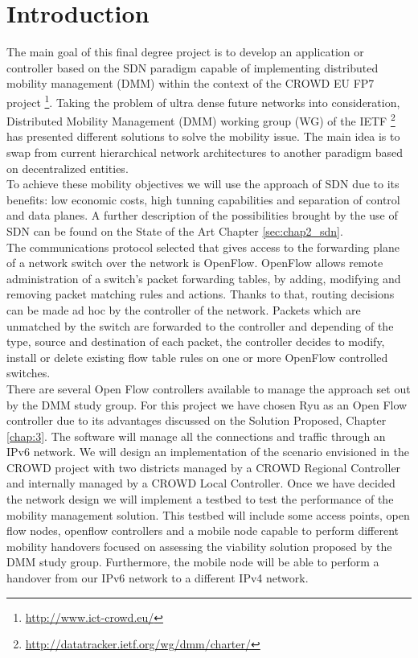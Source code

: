 \chapter{Introduction}\label{chap:1}
The main goal of this final degree project is to develop an application or controller based on the SDN \cite{sdn_wiki} paradigm capable of implementing distributed mobility management (DMM) \cite{ddm_standars_landscape} within the context of the CROWD EU FP7 project \footnote{\url{http://www.ict-crowd.eu/}}. Taking the problem of ultra dense future networks into consideration, Distributed Mobility Management (DMM) working group (WG) of the IETF \footnote{\url{http://datatracker.ietf.org/wg/dmm/charter/}} has presented different solutions to solve the mobility issue. The main idea is to swap from current hierarchical network architectures to another paradigm based on decentralized entities.\\

To achieve these mobility objectives we will use the approach of SDN due to its benefits: low economic costs, high tunning capabilities and separation of control and data planes. A further description of the possibilities brought by the use of SDN can be found on the State of the Art Chapter \ref{sec:chap2_sdn}. \\

The communications protocol selected that gives access to the forwarding plane of a network switch over the network is OpenFlow\cite{openflow_white_paper}. OpenFlow allows remote administration of a switch's packet forwarding tables, by adding, modifying and removing packet matching rules and actions. Thanks to that, routing decisions can be made ad hoc by the controller of the network. Packets which are unmatched by the switch are forwarded to the controller and depending of the type, source and destination of each packet, the controller decides to modify, install or delete existing flow table rules on one or more OpenFlow controlled switches. \\

There are several Open Flow controllers available to manage the approach set out by the DMM study group. For this project we have chosen Ryu as an Open Flow controller due to its advantages discussed on the Solution Proposed, Chapter \ref{chap:3}. The software will manage all the connections and traffic through an IPv6 \cite{ipv6} network. We will design an implementation of the scenario envisioned in the CROWD project with two districts managed by a CROWD Regional Controller and internally managed by a CROWD Local Controller. Once we have decided the network design we will implement a testbed to test the performance of the mobility management solution. This testbed will include some access points, open flow nodes, openflow controllers and a mobile node capable to perform different mobility handovers focused on assessing the viability solution proposed by the DMM study group. Furthermore, the mobile node will be able to perform a handover from our IPv6 network to a different IPv4 \cite{ipv4} network. \\

